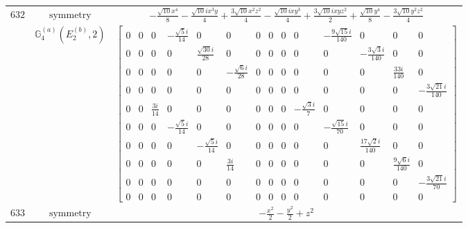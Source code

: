 \documentclass[fleqn,8pt,landscape]{jsarticle}
\begin{document}
\begin{longtable}{ccc}
$ 632 $ & $ \text{symmetry} $ & $ - \frac{\sqrt{10} x^{4}}{8} - \frac{\sqrt{10} i x^{3} y}{4} + \frac{3 \sqrt{10} x^{2} z^{2}}{4} - \frac{\sqrt{10} i x y^{3}}{4} + \frac{3 \sqrt{10} i x y z^{2}}{2} + \frac{\sqrt{10} y^{4}}{8} - \frac{3 \sqrt{10} y^{2} z^{2}}{4} $ \\
$  $ & $ \mathbb{G}_{4}^{(a)}(E_{2}^{(b)},2) $ & $ \begin{bmatrix} 0 & 0 & 0 & - \frac{\sqrt{5} i}{14} & 0 & 0 & 0 & 0 & 0 & 0 & - \frac{9 \sqrt{15} i}{140} & 0 & 0 & 0 \\ 0 & 0 & 0 & 0 & \frac{\sqrt{30} i}{28} & 0 & 0 & 0 & 0 & 0 & 0 & - \frac{3 \sqrt{3} i}{140} & 0 & 0 \\ 0 & 0 & 0 & 0 & 0 & - \frac{\sqrt{6} i}{28} & 0 & 0 & 0 & 0 & 0 & 0 & \frac{33 i}{140} & 0 \\ 0 & 0 & 0 & 0 & 0 & 0 & 0 & 0 & 0 & 0 & 0 & 0 & 0 & - \frac{3 \sqrt{21} i}{140} \\ 0 & 0 & \frac{3 i}{14} & 0 & 0 & 0 & 0 & 0 & 0 & - \frac{\sqrt{3} i}{7} & 0 & 0 & 0 & 0 \\ 0 & 0 & 0 & - \frac{\sqrt{5} i}{14} & 0 & 0 & 0 & 0 & 0 & 0 & - \frac{\sqrt{15} i}{70} & 0 & 0 & 0 \\ 0 & 0 & 0 & 0 & - \frac{\sqrt{5} i}{14} & 0 & 0 & 0 & 0 & 0 & 0 & \frac{17 \sqrt{2} i}{140} & 0 & 0 \\ 0 & 0 & 0 & 0 & 0 & \frac{3 i}{14} & 0 & 0 & 0 & 0 & 0 & 0 & \frac{9 \sqrt{6} i}{140} & 0 \\ 0 & 0 & 0 & 0 & 0 & 0 & 0 & 0 & 0 & 0 & 0 & 0 & 0 & - \frac{3 \sqrt{21} i}{70} \\ 0 & 0 & 0 & 0 & 0 & 0 & 0 & 0 & 0 & 0 & 0 & 0 & 0 & 0 \end{bmatrix} $ \\ \hline
$ 633 $ & $ \text{symmetry} $ & $ - \frac{x^{2}}{2} - \frac{y^{2}}{2} + z^{2} $ \\

\end{longtable}
\end{document}
